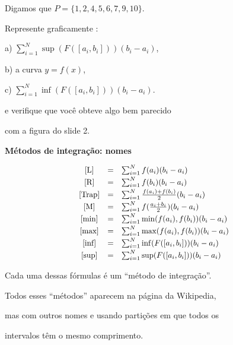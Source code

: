 \documentclass[oneside,12pt]{article}
\begin{document}
\bsk

Digamos que $P=\{ 1, 2,4, 5,6, 7,9, 10 \}$.

Represente graficamente :

\msk

a) $\sum_{i=1}^{N} \sup(F([a_i,b_i])) (b_i - a_i)$,

b) a curva $y=f(x)$,

c) $\sum_{i=1}^{N} \inf(F([a_i,b_i])) (b_i - a_i)$.

\msk

e verifique que você obteve algo bem parecido

com a figura do slide 2.



\newpage


{\bf Métodos de integração: nomes}

\def\sumiN#1{\sum_{i=1}^N #1 (b_i-a_i)}
\def\mname#1{\text{[#1]}}
%
$$\scalebox{0.95}{$
  \begin{array}{ccl}
  \mname{L}    &=& \sumiN {f(a_i)}                    \\[2pt]
  \mname{R}    &=& \sumiN {f(b_i)}                    \\[2pt]
  \mname{Trap} &=& \sumiN {\frac{f(a_i) + f(b_i)}{2}} \\[2pt]
  \mname{M}    &=& \sumiN {f(\frac{a_i+b_i}{2})}      \\[2pt]
  \mname{min}  &=& \sumiN {\min(f(a_i), f(b_i))}      \\[2pt]
  \mname{max}  &=& \sumiN {\max(f(a_i), f(b_i))}      \\[2pt]
  \mname{inf}  &=& \sumiN {\inf(F([a_i,b_i]))}        \\[2pt]
  \mname{sup}  &=& \sumiN {\sup(F([a_i,b_i]))}        \\
  \end{array}
  $}
$$

Cada uma dessas fórmulas é um ``método de integração''.

Todos esses ``métodos'' aparecem na página da Wikipedia,

mas com outros nomes e usando partições em que todos os

intervalos têm o mesmo comprimento.

\newpage

\end{document}
